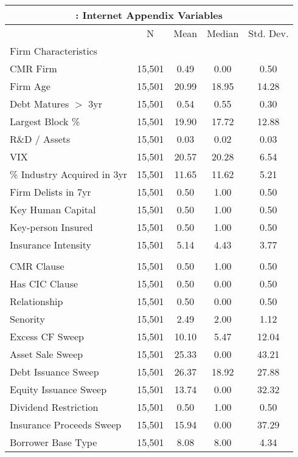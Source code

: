 {
\def\sym#1{\ifmmode^{#1}\else\(^{#1}\)\fi}
\begin{tabular}{l*{1}{cccc}}
\toprule
\multicolumn{5}{c}{\small \centering {Panel D}: Internet Appendix Variables}\\ \midrule                    &           N&        Mean&      Median&   Std. Dev.\\
\midrule
\multicolumn{5}{l}{{Firm Characteristics}} \\ CMR Firm            &      15,501&        0.49&        0.00&        0.50\\
Firm Age            &      15,501&       20.99&       18.95&       14.28\\
Debt Matures $ > $ 3yr&      15,501&        0.54&        0.55&        0.30\\
Largest Block \%    &      15,501&       19.90&       17.72&       12.88\\
R\&D / Assets       &      15,501&        0.03&        0.02&        0.03\\
VIX                 &      15,501&       20.57&       20.28&        6.54\\
\% Industry Acquired in 3yr&      15,501&       11.65&       11.62&        5.21\\
Firm Delists in 7yr &      15,501&        0.50&        1.00&        0.50\\
Key Human Capital   &      15,501&        0.50&        1.00&        0.50\\
Key-person Insured  &      15,501&        0.50&        1.00&        0.50\\
Insurance Intensity &      15,501&        5.14&        4.43&        3.77\\
\addlinespace \multicolumn{5}{l}{{Loan Characteristics}} \\ CMR Clause          &      15,501&        0.50&        1.00&        0.50\\
Has CIC Clause      &      15,501&        0.50&        0.00&        0.50\\
Relationship        &      15,501&        0.50&        0.00&        0.50\\
Senority            &      15,501&        2.49&        2.00&        1.12\\
Excess CF Sweep     &      15,501&       10.10&        5.47&       12.04\\
Asset Sale Sweep    &      15,501&       25.33&        0.00&       43.21\\
Debt Issuance Sweep &      15,501&       26.37&       18.92&       27.88\\
Equity Issuance Sweep&      15,501&       13.74&        0.00&       32.32\\
Dividend Restriction&      15,501&        0.50&        1.00&        0.50\\
Insurance Proceeds Sweep&      15,501&       15.94&        0.00&       37.29\\
Borrower Base Type  &      15,501&        8.08&        8.00&        4.34\\
\bottomrule
\end{tabular}
}
